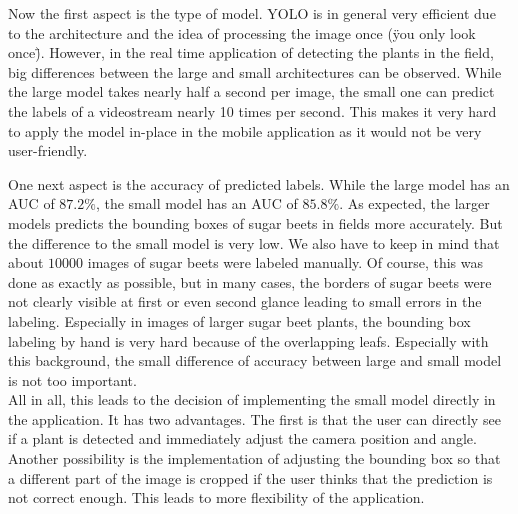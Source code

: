 Now the first aspect is the type of model. YOLO is in general very efficient due to the architecture and the idea of processing the image once (\"you only look once\"). However, in the real time application of detecting the plants in the field, big differences between the large and small architectures can be observed. While the large model takes nearly half a second per image, the small one can predict the labels of a videostream nearly 10 times per second. This makes it very hard to apply the model in-place in the mobile application as it would not be very user-friendly.

One next aspect is the accuracy of predicted labels. While the large model has an AUC of $ 87.2\% $, the small model has an AUC of $ 85.8\% $. As expected, the larger models predicts the bounding boxes of sugar beets in fields more accurately. But the difference to the small model is very low. We also have to keep in mind that about $ 10000 $ images of sugar beets were labeled manually. Of course, this was done as exactly as possible, but in many cases, the borders of sugar beets were not clearly visible at first or even second glance leading to small errors in the labeling. Especially in images of larger sugar beet plants, the bounding box labeling by hand is very hard because of the overlapping leafs. Especially with this background, the small difference of accuracy between large and small model is not too important.\\

All in all, this leads to the decision of implementing the small model directly in the application. It has two advantages. The first is that the user can directly see if a plant is detected and immediately adjust the camera position and angle. Another possibility is the implementation of adjusting the bounding box so that a different part of the image is cropped if the user thinks that the prediction is not correct enough. This leads to more flexibility of the application. \\

